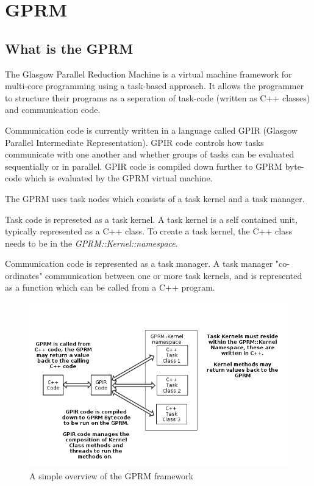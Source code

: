 \section{GPRM}

\subsection{What is the GPRM}

The Glasgow Parallel Reduction Machine is a virtual machine framework for multi-core programming using a task-based approach. It allows the programmer to structure their programs as a seperation of task-code (written as C++ classes) and communication code. 

Communication code is currently written in a language called GPIR (Glasgow Parallel Intermediate Representation). 
GPIR code controls how tasks communicate with one another and whether groups
of tasks can be evaluated sequentially or in parallel.  GPIR code is compiled down further to GPRM byte-code which is evaluated by the GPRM virtual machine.

The GPRM uses task nodes which consists of a task kernel and a task manager.

Task code is represeted as a task kernel. A task kernel is a self contained unit, typically represented as a C++ class.
To create a task kernel, the C++ class needs to be in the \textit{GPRM::Kernel::namespace}.

Communication code is represented as a task manager. A task manager "co-ordinates" communication between one or more task kernels, and
is represented as a function which can be called from a C++ program.\cite{GPRM}

\newpage

\begin{figure}[ht]
\begin{center}
\includegraphics{graphs/gprm.png}
\caption{A simple overview of the GPRM framework}
\end{center}
\end{figure}

